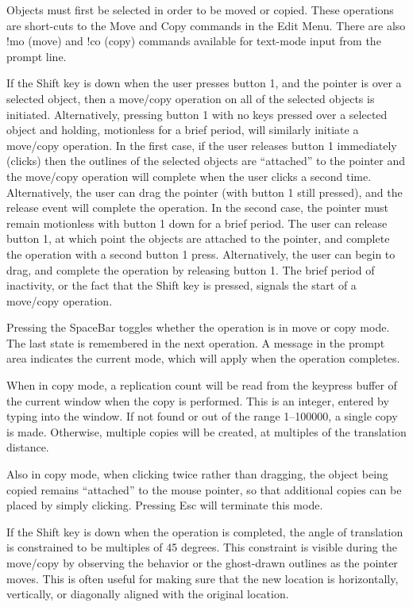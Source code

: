 Objects must first be selected in order to be moved or copied.  These
operations are short-cuts to the {\cb Move} and {\cb Copy} commands in
the {\cb Edit Menu}.  There are also {\cb !mo} (move) and {\cb !co}
(copy) commands available for text-mode input from the prompt line.

If the {\kb Shift} key is down when the user presses button 1, and the
pointer is over a selected object, then a move/copy operation on all
of the selected objects is initiated.  Alternatively, pressing button
1 with no keys pressed over a selected object and holding, motionless
for a brief period, will similarly initiate a move/copy operation.  In
the first case, if the user releases button 1 immediately (clicks)
then the outlines of the selected objects are ``attached'' to the
pointer and the move/copy operation will complete when the user clicks
a second time.  Alternatively, the user can drag the pointer (with
button 1 still pressed), and the release event will complete the
operation.  In the second case, the pointer must remain motionless
with button 1 down for a brief period.  The user can release button 1,
at which point the objects are attached to the pointer, and complete
the operation with a second button 1 press.  Alternatively, the user
can begin to drag, and complete the operation by releasing button 1. 
The brief period of inactivity, or the fact that the {\kb Shift} key
is pressed, signals the start of a move/copy operation.

Pressing the {\kb SpaceBar} toggles whether the operation is in move
or copy mode.  The last state is remembered in the next operation.  A
message in the prompt area indicates the current mode, which will
apply when the operation completes.

When in copy mode, a replication count will be read from the keypress
buffer of the current window when the copy is performed.  This is an
integer, entered by typing into the window.  If not found or out of
the range 1--100000, a single copy is made.  Otherwise, multiple
copies will be created, at multiples of the translation distance.

Also in copy mode, when clicking twice rather than dragging, the
object being copied remains ``attached'' to the mouse pointer, so
that additional copies can be placed by simply clicking.  Pressing
{\kb Esc} will terminate this mode.

If the {\kb Shift} key is down when the operation is completed, the
angle of translation is constrained to be multiples of 45 degrees. 
This constraint is visible during the move/copy by observing the
behavior or the ghost-drawn outlines as the pointer moves.  This is
often useful for making sure that the new location is horizontally,
vertically, or diagonally aligned with the original location.

